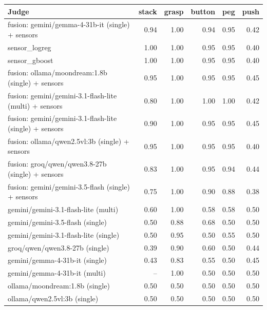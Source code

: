 \begin{tabular}{lrrrrr}
\toprule
Judge & stack & grasp & button & peg & push \\
\midrule
fusion: gemini/gemma-4-31b-it (single) + sensors & 0.94 & 1.00 & 0.94 & 0.95 & 0.42 \\
sensor\_logreg & 1.00 & 1.00 & 0.95 & 0.95 & 0.40 \\
sensor\_gboost & 1.00 & 1.00 & 0.95 & 0.95 & 0.40 \\
fusion: ollama/moondream:1.8b (single) + sensors & 0.95 & 1.00 & 0.95 & 0.95 & 0.45 \\
fusion: gemini/gemini-3.1-flash-lite (multi) + sensors & 0.80 & 1.00 & 1.00 & 1.00 & 0.42 \\
fusion: gemini/gemini-3.1-flash-lite (single) + sensors & 0.90 & 1.00 & 0.95 & 0.95 & 0.45 \\
fusion: ollama/qwen2.5vl:3b (single) + sensors & 0.95 & 1.00 & 0.95 & 0.95 & 0.40 \\
fusion: groq/qwen/qwen3.8-27b (single) + sensors & 0.83 & 1.00 & 0.95 & 0.94 & 0.44 \\
fusion: gemini/gemini-3.5-flash (single) + sensors & 0.75 & 1.00 & 0.90 & 0.88 & 0.38 \\
gemini/gemini-3.1-flash-lite (multi) & 0.60 & 1.00 & 0.58 & 0.58 & 0.50 \\
gemini/gemini-3.5-flash (single) & 0.50 & 0.88 & 0.68 & 0.50 & 0.50 \\
gemini/gemini-3.1-flash-lite (single) & 0.50 & 0.95 & 0.50 & 0.55 & 0.50 \\
groq/qwen/qwen3.8-27b (single) & 0.39 & 0.90 & 0.60 & 0.50 & 0.44 \\
gemini/gemma-4-31b-it (single) & 0.43 & 0.83 & 0.55 & 0.50 & 0.45 \\
gemini/gemma-4-31b-it (multi) & -- & 1.00 & 0.50 & 0.50 & 0.50 \\
ollama/moondream:1.8b (single) & 0.50 & 0.50 & 0.50 & 0.50 & 0.50 \\
ollama/qwen2.5vl:3b (single) & 0.50 & 0.50 & 0.50 & 0.50 & 0.50 \\
\bottomrule
\end{tabular}